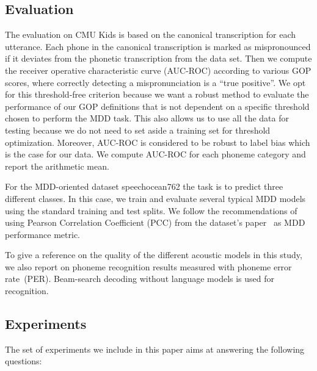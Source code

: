 \subsection{Evaluation}
The evaluation on CMU Kids is based on the canonical transcription for each utterance.
Each phone in the canonical transcription is marked as mispronounced if it deviates from the phonetic transcription from the data set.
Then we compute the receiver operative characteristic curve (AUC-ROC) according to various GOP scores, where correctly detecting a mispronunciation is a ``true positive''.
We opt for this threshold-free criterion because we want a robust method to evaluate the performance of our GOP definitions that is not dependent on a specific threshold chosen to perform the MDD task.
This also allows us to use all the data for testing because we do not need to set aside a training set for threshold optimization.
Moreover, AUC-ROC is considered to be robust to label bias which is the case for our data.
We compute AUC-ROC for each phoneme category and report the arithmetic mean.   

For the MDD-oriented dataset speechocean762 the task is to predict three different classes.
In this case, we train and evaluate several typical MDD models using the standard training and test splits.
We follow the recommendations of using Pearson Correlation Coefficient (PCC) from the dataset's paper~\cite{speechocean762} as MDD performance metric.
 
To give a reference on the quality of the different acoustic models in this study, we also report on phoneme recognition results measured with phoneme error rate~(PER). 
Beam-search decoding without language models is used for recognition.

\begin{table}
\centering
\caption{Mispronunciation Detection on CMU Kids}
\label{tbl:cmu_method_comparison}

\end{table}



\subsection{Experiments}
The set of experiments we include in this paper aims at answering the following questions:

